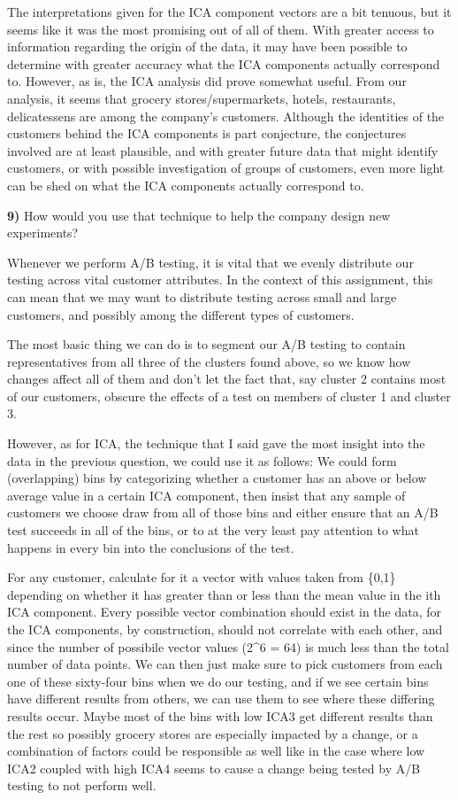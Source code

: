 \documentclass{article}
\begin{document}
The interpretations given for the ICA component vectors are a bit
tenuous, but it seems like it was the most promising out of all of them.
With greater access to information regarding the origin of the data, it
may have been possible to determine with greater accuracy what the ICA
components actually correspond to. However, as is, the ICA analysis did
prove somewhat useful. From our analysis, it seems that grocery
stores/supermarkets, hotels, restaurants, delicatessens are among the
company's customers. Although the identities of the customers behind the
ICA components is part conjecture, the conjectures involved are at least
plausible, and with greater future data that might identify customers,
or with possible investigation of groups of customers, even more light
can be shed on what the ICA components actually correspond to.

    \textbf{9)} How would you use that technique to help the company design
new experiments?

    Whenever we perform A/B testing, it is vital that we evenly distribute
our testing across vital customer attributes. In the context of this
assignment, this can mean that we may want to distribute testing across
small and large customers, and possibly among the different types of
customers.

The most basic thing we can do is to segment our A/B testing to contain
representatives from all three of the clusters found above, so we know
how changes affect all of them and don't let the fact that, say cluster
2 contains most of our customers, obscure the effects of a test on
members of cluster 1 and cluster 3.

However, as for ICA, the technique that I said gave the most insight
into the data in the previous question, we could use it as follows: We
could form (overlapping) bins by categorizing whether a customer has an
above or below average value in a certain ICA component, then insist
that any sample of customers we choose draw from all of those bins and
either ensure that an A/B test succeeds in all of the bins, or to at the
very least pay attention to what happens in every bin into the
conclusions of the test.

For any customer, calculate for it a vector with values taken from
\{0,1\} depending on whether it has greater than or less than the mean
value in the ith ICA component. Every possible vector combination should
exist in the data, for the ICA components, by construction, should not
correlate with each other, and since the number of possibile vector
values (2\^{}6 = 64) is much less than the total number of data points.
We can then just make sure to pick customers from each one of these
sixty-four bins when we do our testing, and if we see certain bins have
different results from others, we can use them to see where these
differing results occur. Maybe most of the bins with low ICA3 get
different results than the rest so possibly grocery stores are
especially impacted by a change, or a combination of factors could be
responsible as well like in the case where low ICA2 coupled with high
ICA4 seems to cause a change being tested by A/B testing to not perform
well.
\end{document}
